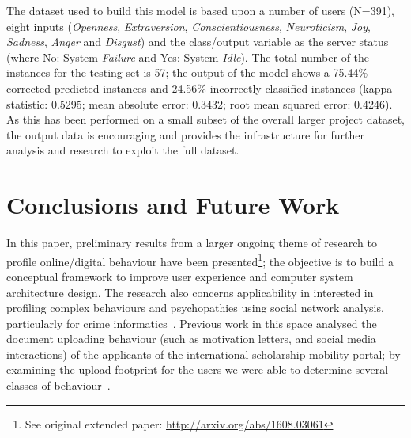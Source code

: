 \documentclass[graybox]{svmult}
\begin{document}
{{{The dataset used to build this model is based upon a number of users
(N=391), eight inputs ({\emph{Openness}}, {\emph{Extraversion}},
{\emph{Conscientiousness}}, {\emph{Neuroticism}}, {\emph{Joy}},
{\emph{Sadness}}, {\emph{Anger}} and {\emph{Disgust}}) and the
class/output variable as the server status (where No: System
{\emph{Failure}} and Yes: System {\emph{Idle}}). The total number of
the instances for the testing set is 57; the output of the model shows
a 75.44\% corrected predicted instances and 24.56\% incorrectly
classified instances (kappa statistic: 0.5295; mean absolute error:
0.3432; root mean squared error: 0.4246). As this has been performed
on a small subset of the overall larger project dataset, the output
data is encouraging and provides the infrastructure for further
analysis and research to exploit the full dataset.

\section{Conclusions and Future Work}\label{conclusions}



In this paper, preliminary results from a larger ongoing theme of
research to profile online/digital behaviour have been
presented\footnote{See original extended paper:
\url{http://arxiv.org/abs/1608.03061}}; the objective is to build a
conceptual framework to improve user experience and computer system
architecture design. The research also concerns applicability in
interested in profiling complex behaviours and psychopathies using
social network analysis, particularly for crime
informatics~\cite{oatley+crick:2015}. Previous work in this space
analysed the document uploading behaviour (such as motivation letters,
and social media interactions) of the applicants of the international
scholarship mobility portal; by examining the upload footprint for the
users we were able to determine several classes of
behaviour~\citep{oatley-et-al-soccogcomp2015}.

}}}
\end{document}
